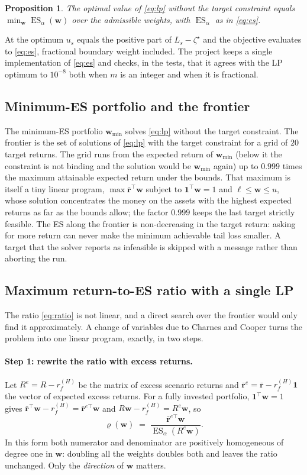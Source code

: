 \documentclass[11pt,a4paper]{article}
\newcommand{\ES}{\operatorname{ES}}
\newcommand{\w}{\mathbf{w}}
\newcommand{\rr}{\mathbf{r}}
\newcommand{\ones}{\mathbf{1}}
\theoremstyle{plain}
\newtheorem{proposition}{Proposition}
\theoremstyle{remark}
\begin{document}
\begin{proposition}
The optimal value of \eqref{eq:lp} without the target constraint equals
$\min_{\w} \ES_\alpha(\w)$ over the admissible weights, with $\ES_\alpha$ as
in \eqref{eq:es}.
\end{proposition}

At the optimum $u_s$ equals the positive part of $L_s - \zeta^\star$ and the
objective evaluates to \eqref{eq:es}, fractional boundary weight included.
The project keeps a single implementation of \eqref{eq:es} and checks, in
the tests, that it agrees with the LP optimum to $10^{-8}$ both when $m$ is
an integer and when it is fractional.

\subsection{Minimum-ES portfolio and the frontier}

The minimum-ES portfolio $\w_{\min}$ solves \eqref{eq:lp} without the target
constraint. The frontier is the set of solutions of \eqref{eq:lp} with the
target constraint for a grid of $20$ target returns. The grid runs from the
expected return of $\w_{\min}$ (below it the constraint is not binding and
the solution would be $\w_{\min}$ again) up to $0.999$ times the maximum
attainable expected return under the bounds. That maximum is itself a tiny
linear program, $\max \bar{\rr}^\top\w$ subject to $\ones^\top\w = 1$ and
$\ell\le\w\le u$, whose solution concentrates the money on the assets with
the highest expected returns as far as the bounds allow; the factor $0.999$
keeps the last target strictly feasible. The ES along the frontier is
non-decreasing in the target return: asking for more return can never make
the minimum achievable tail loss smaller. A target that the solver reports
as infeasible is skipped with a message rather than aborting the run.

\subsection{Maximum return-to-ES ratio with a single LP}
\label{sec:maxratio}

The ratio \eqref{eq:ratio} is not linear, and a direct search over the
frontier would only find it approximately. A change of variables due to
Charnes and Cooper \cite{cc} turns the problem into one linear program,
exactly, in two steps.

\paragraph{Step 1: rewrite the ratio with excess returns.} Let
$R^{e} = R - r_f^{(H)}$ be the matrix of excess scenario returns and
$\bar{\rr}^{e} = \bar{\rr} - r_f^{(H)}\ones$ the vector of expected excess
returns. For a fully invested portfolio, $\ones^\top\w = 1$ gives
$\bar{\rr}^\top\w - r_f^{(H)} = \bar{\rr}^{e\top}\w$ and
$R\w - r_f^{(H)} = R^{e}\w$, so
\[
  \varrho(\w) \;=\; \frac{\bar{\rr}^{e\top}\w}{\ES_\alpha(R^{e}\w)} .
\]
In this form both numerator and denominator are positively homogeneous of
degree one in $\w$: doubling all the weights doubles both and leaves the
ratio unchanged. Only the \emph{direction} of $\w$ matters.
\end{document}
